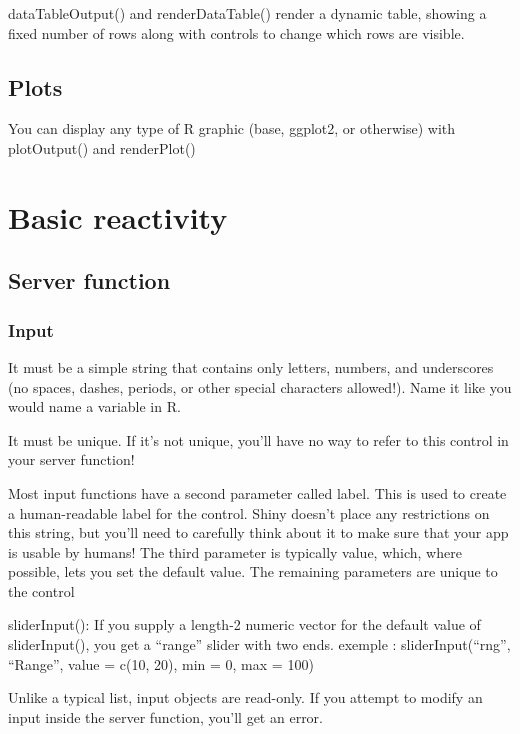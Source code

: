 \documentclass[
]{book}
\begin{document}
dataTableOutput() and renderDataTable() render a dynamic table, showing a fixed number of rows along with controls to change which rows are visible.

\hypertarget{plots}{%
\subsection{Plots}\label{plots}}

You can display any type of R graphic (base, ggplot2, or otherwise) with plotOutput() and renderPlot()

\hypertarget{basic-reactivity}{%
\section{Basic reactivity}\label{basic-reactivity}}

\hypertarget{server-function}{%
\subsection{Server function}\label{server-function}}

\hypertarget{input}{%
\subsubsection{Input}\label{input}}

It must be a simple string that contains only letters, numbers, and underscores (no spaces, dashes, periods, or other special characters allowed!). Name it like you would name a variable in R.

It must be unique. If it's not unique, you'll have no way to refer to this control in your server function!

Most input functions have a second parameter called label. This is used to create a human-readable label for the control. Shiny doesn't place any restrictions on this string, but you'll need to carefully think about it to make sure that your app is usable by humans! The third parameter is typically value, which, where possible, lets you set the default value. The remaining parameters are unique to the control

sliderInput(): If you supply a length-2 numeric vector for the default value of sliderInput(), you get a ``range'' slider with two ends.
exemple : sliderInput(``rng'', ``Range'', value = c(10, 20), min = 0, max = 100)

Unlike a typical list, input objects are read-only. If you attempt to modify an input inside the server function, you'll get an error.
\end{document}
